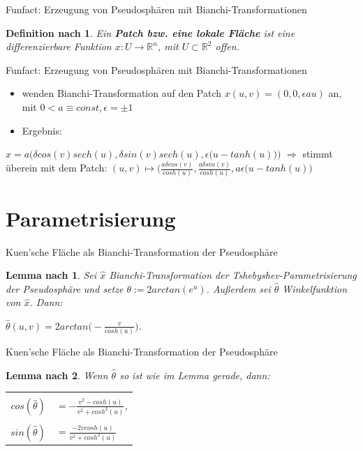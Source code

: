 \documentclass[12pt]{beamer}
\newtheorem{mydef}{Definition nach \cite{gray}}
\newtheorem{mylem}{Lemma nach \cite{gray}}
\begin{document}
\begin{frame}{Funfact: Erzeugung von Pseudosphären mit Bianchi-Transformationen}
\begin{mydef}
Ein \textbf{Patch bzw. eine lokale Fläche} ist eine differenzierbare Funktion $x: U \rightarrow \mathbb{R}^n$, mit $U \subset \mathbb{R}^2$ offen. 
\end{mydef}
\end{frame}

\begin{frame}{Funfact: Erzeugung von Pseudosphären mit Bianchi-Transformationen}
\begin{itemize}
\item wenden Bianchi-Transformation auf den Patch $x(u,v) = (0,0,\epsilon au)$ an, mit $0 < a \equiv const, \epsilon = \pm1$
\item Ergebnis:
\end{itemize}
\centering $\hat{x} = a\Big (\delta cos(v) sech(u), \delta sin(v) sech(u), \epsilon\big(u-tanh(u)\big)\Big)$\newline\newline
$\Rightarrow$ stimmt überein mit dem Patch: \newline\newline
\centering
$(u,v) \mapsto \Big(\frac{a\delta cos(v)}{cosh(u)}, \frac{a\delta sin(v)}{cosh(u)}, a\epsilon(u - tanh(u)\Big)$
\end{frame}

\section{Parametrisierung}
\begin{frame}{Kuen'sche Fläche als Bianchi-Transformation der Pseudosphäre}
\begin{mylem}
Sei $\hat{x}$ Bianchi-Transformation der Tshebyshev-Parametrisierung der Pseudosphäre und setze $\theta := 2arctan(e^u)$.
Außerdem sei $\hat{\theta}$ Winkelfunktion von $\hat{x}$. Dann:
\begin{center}
$\hat{\theta}(u,v) = 2arctan\big(-\frac{v}{cosh(u)}\big)$.
\end{center}
\end{mylem}
\end{frame}

\begin{frame}{Kuen'sche Fläche als Bianchi-Transformation der Pseudosphäre}
\begin{mylem}
Wenn $\hat{\theta}$ so ist wie im Lemma gerade, dann:
\begin{tabular}{rl}
&\\
$cos(\hat{\theta})$ & $ = -\frac{v^2 - cosh(u)}{v^2 + cosh^2(u)}$,\\
&\\
$sin(\hat{\theta})$ & $ = \frac{-2v cosh(u)}{v^2 + cosh^2(u)}$
\end{tabular}

\end{mylem}
\end{frame}
\end{document}
